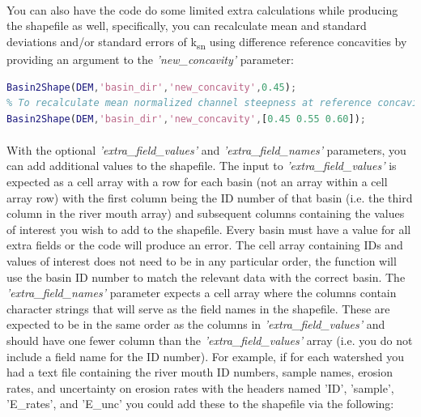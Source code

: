 \paragraph{}You can also have the code do some limited extra calculations while producing the shapefile as well, specifically, you can recalculate mean and standard deviations and/or standard errors of k\textsubscript{sn} using difference reference concavities by providing an argument to the \textit{'new\_concavity'} parameter:

\begin{lstlisting}[language=Matlab]
% To recaculate mean normalized channel steepness with a reference concavity of 0.45
Basin2Shape(DEM,'basin_dir','new_concavity',0.45);
% To recalculate mean normalized channel steepness at reference concavities of 0.45, 0.55, and 0.60
Basin2Shape(DEM,'basin_dir','new_concavity',[0.45 0.55 0.60]);
\end{lstlisting}

\paragraph{}With the optional \textit{'extra\_field\_values'} and \textit{'extra\_field\_names'} parameters, you can add additional values to the shapefile. The input to \textit{'extra\_field\_values'} is expected as a cell array with a row for each basin (not an array within a cell array row) with the first column being the ID number of that basin (i.e. the third column in the river mouth array) and subsequent columns containing the values of interest you wish to add to the shapefile. Every basin must have a value for all extra fields or the code will produce an error. The cell array containing IDs and values of interest does not need to be in any particular order, the function will use the basin ID number to match the relevant data with the correct basin. The \textit{'extra\_field\_names'} parameter expects a cell array where the columns contain character strings that will serve as the field names in the shapefile. These are expected to be in the same order as the columns in \textit{'extra\_field\_values'} and should have one fewer column than the \textit{'extra\_field\_values'}  array (i.e. you do not include a field name for the ID number). For example, if for each watershed you had a text file containing the river mouth ID numbers, sample names, erosion rates, and uncertainty on erosion rates with the headers named 'ID', 'sample', 'E\_rates', and 'E\_unc' you could add these to the shapefile via the following:

